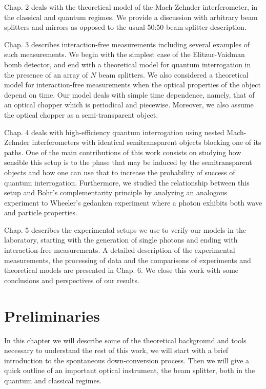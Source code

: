 \documentclass[12pt]{book}
\begin{document}
Chap. 2 deals with the theoretical model of the Mach-Zehnder interferometer, in the classical and quantum regimes. We provide a discussion with arbitrary beam splitters and mirrors as opposed to the usual 50:50 beam splitter description.

Chap. 3 describes interaction-free measurements including several examples of such measurements. We begin with the simplest case of the Elitzur-Vaidman bomb detector, and end with a theoretical model for quantum interrogation in the presence of an array of $N$ beam splitters. We also considered a theoretical model for interaction-free measurements when the optical properties of the object depend on time. Our model deals with simple time dependence, namely, that of an optical chopper which is periodical and piecewise. Moreover, we also assume the optical chopper as a semi-transparent object.

Chap. 4  deals with high-efficiency quantum interrogation using nested Mach-Zehnder interferometers with identical semitransparent objects blocking one of its paths. One of the main contributions of this work consists on studying how sensible this setup is to the phase that may be induced by the semitransparent objects and how one can use that to increase the probability of success of quantum interrogation. Furthermore, we studied the relationship between this setup and Bohr's complementarity principle by analyzing an analogous experiment to Wheeler's gedanken experiment where a photon exhibits both wave and particle properties.

Chap. 5 describes the experimental setups we use to verify our models in the laboratory, starting with the generation of single photons and ending with interaction-free measurements. A detailed description of the experimental measurements, the processing of data and the comparisons of experiments and theoretical models are presented in Chap. 6. We close this work with some conclusions and perspectives of our results.
 
  
\pagebreak



\chapter{Preliminaries}

In this chapter we will describe some of the theoretical background and tools necessary to understand the rest of this work, we will start with a brief introduction to the spontaneous down-conversion process. Then we will give a quick outline of an important optical instrument, the beam splitter, both in the quantum and classical regimes.
\end{document}
